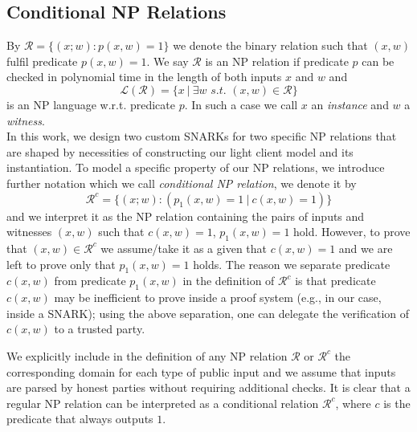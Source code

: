 \subsection{Conditional NP Relations}
\label{sec:conditional_relations}
\noindent By $\mathcal{R} =\{(x;w): p(x,w) = 1 \}$ we denote the binary relation such that $(x,w)$ 
fulfil predicate $p(x,w) = 1$. We say $\mathcal{R}$ is an NP relation if predicate $p$ can be checked in polynomial 
time in the length of both inputs $x$ and $w$ and $$\mathcal{L}(\mathcal{R})= \{x \ | \ \exists w \textit{ s.t. } (x,w) \in \mathcal{R} \}$$ 
is an NP language w.r.t. predicate $p$. In such a case we call $x$ an \emph{instance} and $w$ a \emph{witness}.  \\

\noindent  In this work, we design two custom SNARKs for two specific NP relations that are shaped by necessities of 
constructing our light client model and its instantiation. To model a specific property of our NP relations, we introduce further 
notation which we call \emph{conditional NP relation}, we denote it by 
$$\mathcal{R}^c = \{(x;w) : (p_1(x,w) =1 \ | \ c(x,w) =1) \}$$ and we interpret it as the NP relation containing the pairs of inputs and witnesses 
$(x,w)$ such that $c(x,w) =1$, $p_1(x,w) = 1$ hold. However, to prove that $(x,w) \in \mathcal{R}^c$ we assume/take it as a given that 
$c(x,w) =1$ and we are left to prove only that $p_1(x,w) = 1$ holds. The reason we separate predicate $c(x,w)$ from predicate $p_1(x,w)$ in the definition 
of $\mathcal{R}^c$ is that predicate $c(x,w)$ may be inefficient to prove inside a proof system (e.g., in our case, inside a SNARK); using the above separation, one can delegate  the verification of $c(x,w)$ to a trusted party.%

\noindent We explicitly include in the definition of any NP relation $\mathcal{R}$ or $\mathcal{R}^c$ the corresponding domain for each type 
of public input and we assume that inputs are parsed by honest parties without requiring additional checks. 
It is clear that a regular NP relation can be interpreted as a conditional relation $\mathcal{R}^c$, where $c$ is the predicate that always outputs $1$.
\vspace{-0.07in}


